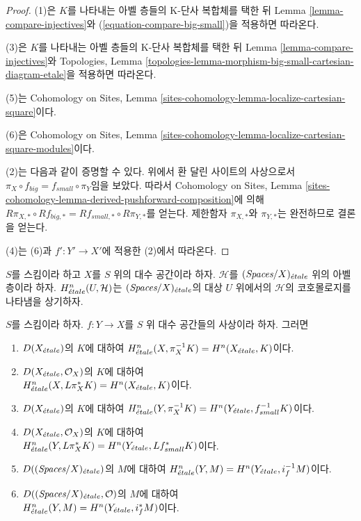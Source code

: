 \begin{proof}
(1)은 $K$를 나타내는 아벨 층들의 K-단사 복합체를 택한 뒤
Lemma \ref{lemma-compare-injectives}와
(\ref{equation-compare-big-small})을 적용하면 따라온다.

\medskip\noindent
(3)은 $K$를 나타내는 아벨 층들의 K-단사 복합체를 택한 뒤
Lemma \ref{lemma-compare-injectives}와 Topologies, Lemma
\ref{topologies-lemma-morphism-big-small-cartesian-diagram-etale}을
적용하면 따라온다.

\medskip\noindent
(5)는 Cohomology on Sites, Lemma
\ref{sites-cohomology-lemma-localize-cartesian-square}이다.

\medskip\noindent
(6)은 Cohomology on Sites, Lemma
\ref{sites-cohomology-lemma-localize-cartesian-square-modules}이다.

\medskip\noindent
(2)는 다음과 같이 증명할 수 있다. 위에서 환 달린 사이트의 사상으로서
$\pi_X \circ f_{big} = f_{small} \circ \pi_Y$임을 보았다. 따라서
Cohomology on Sites, Lemma
\ref{sites-cohomology-lemma-derived-pushforward-composition}에 의해
$R\pi_{X, *} \circ Rf_{big, *} = Rf_{small, *} \circ R\pi_{Y, *}$를
얻는다. 제한함자 $\pi_{X, *}$와 $\pi_{Y, *}$는 완전하므로 결론을 얻는다.

\medskip\noindent
(4)는 (6)과 $f' : Y' \to X'$에 적용한 (2)에서 따라온다.
\end{proof}

\noindent
$S$를 스킴이라 하고 $X$를 $S$ 위의 대수 공간이라 하자.
$\mathcal{H}$를 $(\textit{Spaces}/X)_{\acute{e}tale}$ 위의 아벨 층이라 하자.
$H^n_{\acute{e}tale}(U, \mathcal{H})$는 $(\textit{Spaces}/X)_{\acute{e}tale}$의 대상
$U$ 위에서의 $\mathcal{H}$의 코호몰로지를 나타냄을 상기하자.

\begin{lemma}
\label{lemma-compare-cohomology}
$S$를 스킴이라 하자.
$f : Y \to X$를 $S$ 위 대수 공간들의 사상이라 하자. 그러면
\begin{enumerate}
\item $D(X_{\acute{e}tale})$의 $K$에 대하여
$H^n_{\acute{e}tale}(X, \pi_X^{-1}K) = H^n(X_{\acute{e}tale}, K)$이다.
\item $D(X_{\acute{e}tale}, \mathcal{O}_X)$의 $K$에 대하여\\
$H^n_{\acute{e}tale}(X, L\pi_X^*K) = H^n(X_{\acute{e}tale}, K)$이다.
\item $D(X_{\acute{e}tale})$의 $K$에 대하여
$H^n_{\acute{e}tale}(Y, \pi_X^{-1}K) = H^n(Y_{\acute{e}tale}, f_{small}^{-1}K)$이다.
\item $D(X_{\acute{e}tale}, \mathcal{O}_X)$의 $K$에 대하여\\
$H^n_{\acute{e}tale}(Y, L\pi_X^*K) = H^n(Y_{\acute{e}tale}, Lf_{small}^*K)$이다.
\item $D((\textit{Spaces}/X)_{\acute{e}tale})$의 $M$에 대하여
$H^n_{\acute{e}tale}(Y, M) = H^n(Y_{\acute{e}tale}, i_f^{-1}M)$이다.
\item $D((\textit{Spaces}/X)_{\acute{e}tale}, \mathcal{O})$의 $M$에 대하여\\
$H^n_{\acute{e}tale}(Y, M) = H^n(Y_{\acute{e}tale}, i_f^*M)$이다.
\end{enumerate}
\end{lemma}

